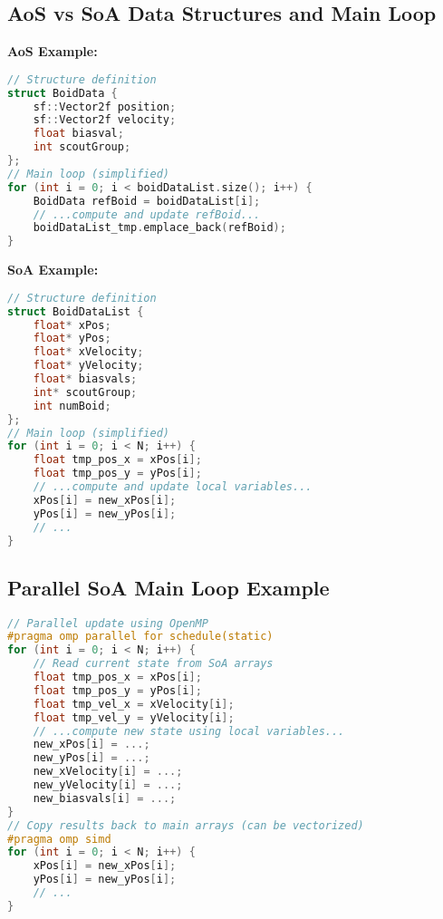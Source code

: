 \documentclass[10pt,twocolumn,letterpaper]{article}
\begin{document}
\subsection*{AoS vs SoA Data Structures and Main Loop}
\label{appendix:aossoa}
\textbf{AoS Example:}
\begin{lstlisting}[language=C++]
// Structure definition
struct BoidData {
    sf::Vector2f position;
    sf::Vector2f velocity;
    float biasval;
    int scoutGroup;
};
// Main loop (simplified)
for (int i = 0; i < boidDataList.size(); i++) {
    BoidData refBoid = boidDataList[i];
    // ...compute and update refBoid...
    boidDataList_tmp.emplace_back(refBoid);
}
\end{lstlisting}

\textbf{SoA Example:}
\begin{lstlisting}[language=C++]
// Structure definition
struct BoidDataList {
    float* xPos;
    float* yPos;
    float* xVelocity;
    float* yVelocity;
    float* biasvals;
    int* scoutGroup;
    int numBoid;
};
// Main loop (simplified)
for (int i = 0; i < N; i++) {
    float tmp_pos_x = xPos[i];
    float tmp_pos_y = yPos[i];
    // ...compute and update local variables...
    xPos[i] = new_xPos[i];
    yPos[i] = new_yPos[i];
    // ...
}
\end{lstlisting}

\subsection*{Parallel SoA Main Loop Example}
\label{appendix:parloop}
\begin{lstlisting}[language=C++]
// Parallel update using OpenMP
#pragma omp parallel for schedule(static)
for (int i = 0; i < N; i++) {
    // Read current state from SoA arrays
    float tmp_pos_x = xPos[i];
    float tmp_pos_y = yPos[i];
    float tmp_vel_x = xVelocity[i];
    float tmp_vel_y = yVelocity[i];
    // ...compute new state using local variables...
    new_xPos[i] = ...;
    new_yPos[i] = ...;
    new_xVelocity[i] = ...;
    new_yVelocity[i] = ...;
    new_biasvals[i] = ...;
}
// Copy results back to main arrays (can be vectorized)
#pragma omp simd
for (int i = 0; i < N; i++) {
    xPos[i] = new_xPos[i];
    yPos[i] = new_yPos[i];
    // ...
}
\end{lstlisting}


\end{document}

